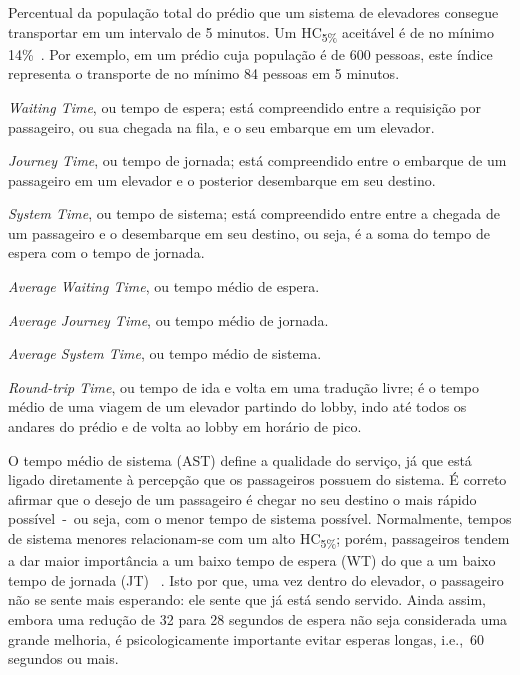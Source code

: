 \begin{description}[leftmargin=!,labelwidth=\widthof{\bfseries HC\textsubscript{5\%}}]
  \item[HC\textsubscript{5\%}]
  Percentual da população total do prédio que um sistema de elevadores consegue
  transportar em um intervalo de 5 minutos. Um HC\textsubscript{5\%} aceitável é
   de no mínimo 14\%~\cite{KOEHLEROTTIGER02}. Por exemplo, em um prédio cuja
   população é de 600 pessoas, este índice representa o transporte de no mínimo
   84 pessoas em 5 minutos.

  \item[WT]
  \textit{Waiting Time}, ou tempo de espera; está compreendido entre a
  requisição por passageiro, ou sua chegada na fila, e o seu embarque em um
  elevador.

  \item[JT]
  \textit{Journey Time}, ou tempo de jornada; está compreendido entre o embarque
   de um passageiro em um elevador e o posterior desembarque em seu destino.

  \item[ST]
  \textit{System Time}, ou tempo de sistema; está compreendido entre entre a
  chegada de um passageiro e o desembarque em seu destino, ou seja, é a soma do
  tempo de espera com o tempo de jornada.

  \item[AWT]
  \textit{Average Waiting Time}, ou tempo médio de espera.

  \item[AJT]
  \textit{Average Journey Time}, ou tempo médio de jornada.

  \item[AST]
  \textit{Average System Time}, ou tempo médio de sistema.

  \item[RTT]
  \textit{Round-trip Time}, ou tempo de ida e volta em uma tradução livre; é o
  tempo médio de uma viagem de um elevador partindo do lobby, indo até todos os
  andares do prédio e de volta ao lobby em horário de pico.
\end{description}

O tempo médio de sistema (AST) define a qualidade do serviço, já que está ligado
diretamente à percepção que os passageiros possuem do sistema. É correto afirmar
que o desejo de um passageiro é chegar no seu destino o mais rápido
possível~-~ou seja, com o menor tempo de sistema possível. Normalmente, tempos
de sistema menores relacionam-se com um alto HC\textsubscript{5\%}; porém,
passageiros tendem a dar maior importância a um baixo tempo de espera (WT) do
que a um baixo tempo de jornada (JT) ~\cite{KOEHLEROTTIGER02}. Isto por que, uma
vez dentro do elevador, o passageiro não se sente mais esperando: ele sente que
já está sendo servido. Ainda assim, embora uma redução de 32 para 28 segundos de
espera não seja considerada uma grande melhoria, é psicologicamente importante
evitar esperas longas, i.e.,~60 segundos ou mais.

